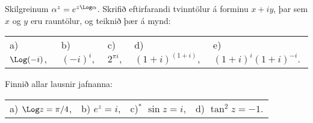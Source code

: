 \daemi Skilgreinum
${\alpha}^z=e^{z\Log\alpha}$.  Skrifið eftirfarandi tvinntölur á forminu
$x+iy$, þar sem $x$ og $y$ eru rauntölur, og teiknið þær á mynd:

\begin{tabular}{lllll}
a) $\Log(-i)$,   
&b) $(-i)^i$,
&c) $2^{{\pi}i}$,
&d) $(1+i)^{(1+i)}$,
&e) $(1+i)^i(1+i)^{-i}$.\\
\end{tabular}


\daemi Finnið allar lausnir jafnanna:
\smallskip

\begin{tabular}{llll}
a) $\Log z={\pi}/4$,
&b) $e^z=i$,
&c)$^*$ $\sin z=i$,
&d) $\tan^2 z=-1$.\\
\end{tabular}


